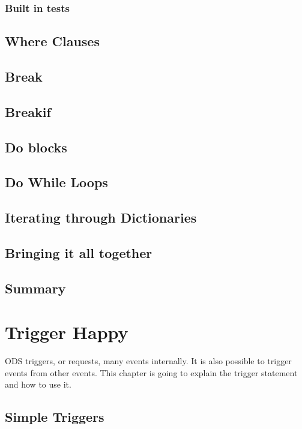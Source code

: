 \documentclass{book}
\begin{document}
\subsection{Built in tests}

\section{Where Clauses}

\section{Break}

\section{Breakif}

\section{Do blocks}

\section{Do While Loops}

\section{Iterating through Dictionaries}

\section{Bringing it all together}

\section{Summary}

\chapter{Trigger Happy}
ODS triggers, or requests, many events internally.  
It is also possible to trigger
events from other events. This chapter is going to
explain the trigger statement and how to use it.  
\section{Simple Triggers}
\end{document}
